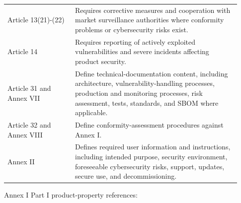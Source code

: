 \documentclass[10pt,a4paper,oneside]{report}
\begin{document}
\begin{longtable}{@{}>{\RaggedRight\arraybackslash}p{0.27\linewidth}>{\RaggedRight\arraybackslash}p{0.66\linewidth}@{}}
Article 13(21)-(22) & Requires corrective measures and cooperation with market surveillance authorities where conformity problems or cybersecurity risks exist. \\
Article 14 & Requires reporting of actively exploited vulnerabilities and severe incidents affecting product security. \\
Article 31 and Annex VII & Define technical-documentation content, including architecture, vulnerability-handling processes, production and monitoring processes, risk assessment, tests, standards, and SBOM where applicable. \\
Article 32 and Annex VIII & Define conformity-assessment procedures against Annex I. \\
Annex II & Defines required user information and instructions, including intended purpose, security environment, foreseeable cybersecurity risks, support, updates, secure use, and decommissioning. \\
\bottomrule
\end{longtable}
\endgroup

Annex I Part I product-property references:
\end{document}
